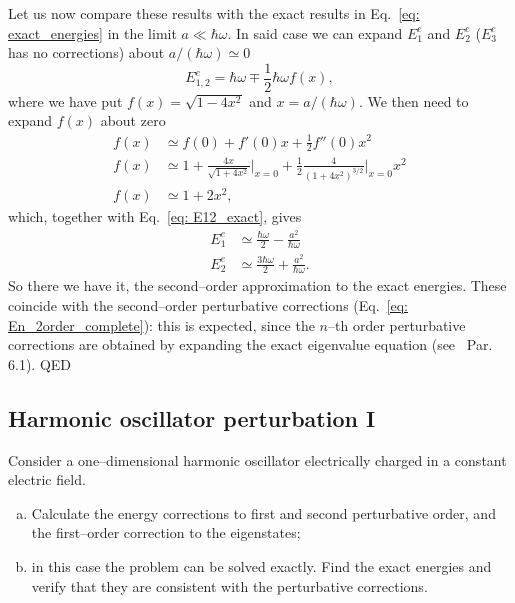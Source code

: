 Let us now compare these results with the exact results in Eq.~\eqref{eq: exact_energies} in the limit $a \ll \hbar \omega$. In said case we can expand $E_1^e$ and $E_2^e$ ($E_3^e$ has no corrections) about $ a/(\hbar \omega) \simeq 0$
\begin{equation}
    \label{eq: E12_exact}
    E_{1,2}^e = \hbar \omega \mp \frac{1}{2} \hbar \omega f(x),
\end{equation}
where we have put $ f(x) = \sqrt{1 - 4 x^2}$ and $x= a/(\hbar \omega)$. We then need to expand $f(x)$ about zero
\begin{equation}
    \begin{split}
        f(x) & \simeq f(0) + f'(0) x + \frac{1}{2} f''(0) x^2 \\
        f(x) & \simeq 1 + \frac{4 x}{\sqrt{1 + 4 x^2}} \biggl|_{x=0}  + \frac{1}{2} \frac{4}{(1 + 4x^2)^{3/2}} \biggl|_{x=0} x^2 \\
        f(x) & \simeq 1 + 2x^2,
    \end{split}
\end{equation}
which, together with Eq.~\eqref{eq: E12_exact}, gives
\begin{align}
    E_{1}^e & \simeq \frac{\hbar \omega}{2} - \frac{a^2}{\hbar \omega} \\
    E_{2}^e & \simeq \frac{3 \hbar \omega}{2} + \frac{a^2}{\hbar \omega}.
\end{align}
So there we have it, the second--order approximation to the exact energies. These coincide with the second--order perturbative corrections (Eq.~\eqref{eq: En_2order_complete}): this is expected, since the $n$--th order perturbative corrections are obtained by expanding the exact eigenvalue equation (see~\cite{griffiths2018introduction} Par. 6.1). QED
\subsection{Harmonic oscillator perturbation I}
Consider a one--dimensional harmonic oscillator electrically charged in a constant electric field.
\begin{enumerate}[(a)]
    \item Calculate the energy corrections to first and second perturbative order, and the first--order correction to the eigenstates;
    \item in this case the problem can be solved exactly. Find the exact energies and verify that they are consistent with the perturbative corrections.
\end{enumerate}

